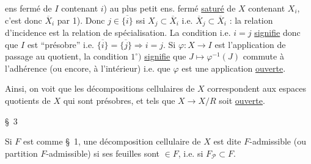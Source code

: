 
ens fermé de $I$ contenant $i$)  au plus petit ens. fermé \uline{saturé} de $X$ contenant $X_i$, c'est donc $\overline X_i$ par 1). Donc $j\in\overline{\{i\}}$ ssi $X_j\subset\overline X_i$ i.e. $\overline X_j\subset\overline X_i$ : la relation d'incidence est la relation de spécialisation. La condition  i.e. $i=j$ \uline{signifie} donc que $I$ est ``présobre''  i.e. $\overline{\{i\}}=\overline{\{j\}}\Longrightarrow i=j$. Si $\varphi:X\to I$ est l'application de passage au quotient, la condition $1^\circ)$ \uline{signifie} que $J\mapsto\varphi^{-1}(J)$ commute à l'adhérence (ou encore, à l'intérieur) i.e. que $\varphi$ est une application \uline{ouverte}.

Ainsi, on voit que les décompositions cellulaires  de $X$ correspondent aux  espaces quotients  de $X$ qui sont présobres, et tels que $X\to X/R$ soit \uline{ouverte}.

\S\ 3  

Si $F$ est comme  \S\ 1, une décomposition cellulaire de $X$ est dite $F$-admissible (ou partition $F$-admissible) si ses feuilles sont $\in F$, i.e. si $F_{\mathcal P}\subset F$.

